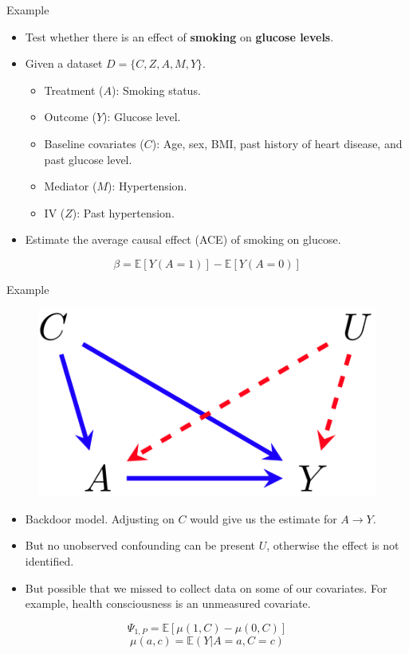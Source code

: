\documentclass{beamer}
\begin{document}
\begin{frame}{Example}
	\begin{itemize}
		\item Test whether there is an effect of \textbf{smoking} on \textbf{glucose levels}.
		\item Given a dataset $ D = \{ C, Z, A, M, Y \} $.
			\begin{itemize}
				\item Treatment ($ A $): Smoking status.
				\item Outcome ($ Y $): Glucose level.
				\item Baseline covariates ($ C $): Age, sex, BMI, past history of heart disease, and past glucose level.
				\item Mediator ($ M $): Hypertension.
				\item IV ($ Z $): Past hypertension.
			\end{itemize}
		\item Estimate the average causal effect (ACE) of smoking on glucose.
	\end{itemize}
			$$ \beta = \mathbb{E}[Y(A=1)] - \mathbb{E}[Y(A=0)] $$
\end{frame}

\begin{frame}{Example}
	\begin{figure}
		\center
		\includegraphics[scale=0.2]{m1.png}
	\end{figure}
	\begin{itemize}
		\item Backdoor model. Adjusting on $ C $ would give us the estimate for $ A \rightarrow Y $.
		\item But no unobserved confounding can be present $ U $, otherwise the effect is not identified.
		\item But possible that we missed to collect data on some of our covariates. For example, health consciousness is an unmeasured covariate. %
	\end{itemize}
	$$ \Psi_{1, P} = \mathbb{E}[\mu(1, C) - \mu(0, C)] $$
	$$ \mu(a, c) = \mathbb{E}(Y | A=a, C=c) $$
\end{frame}
\end{document}
